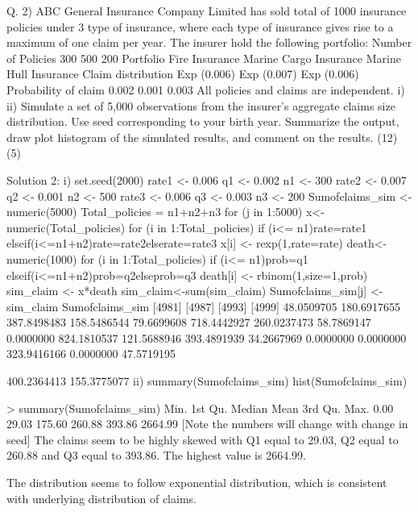 \documentclass[a4paper,12pt]{article}
\begin{document}
Q. 2) ABC General Insurance Company Limited has sold total of 1000 insurance policies under 3
type of insurance, where each type of insurance gives rise to a maximum of one claim per year.
The insurer hold the following portfolio:
Number of
Policies
300
500
200
Portfolio
Fire Insurance
Marine Cargo Insurance
Marine Hull Insurance
Claim
distribution
Exp (0.006)
Exp (0.007)
Exp (0.006)
Probability of
claim
0.002
0.001
0.003
All policies and claims are independent.
i)
ii)
Simulate a set of 5,000 observations from the insurer’s aggregate claims size
distribution. Use seed corresponding to your birth year.
Summarize the output, draw plot histogram of the simulated results, and comment on
the results.
(12)
(5)


Solution 2:
i) set.seed(2000)
rate1 <- 0.006
q1 <- 0.002
n1 <- 300
rate2 <- 0.007
q2 <- 0.001
n2 <- 500
rate3 <- 0.006
q3 <- 0.003
n3 <- 200
Sumofclaims_sim <- numeric(5000)
Total_policies = n1+n2+n3
for (j in 1:5000){
x<-numeric(Total_policies)
for (i in 1:Total_policies)
{if (i<= n1){rate=rate1} else{if(i<=n1+n2){rate=rate2}else{rate=rate3}}
x[i] <- rexp(1,rate=rate)}
death<-numeric(1000)
for (i in 1:Total_policies)
{if (i<= n1){prob=q1} else{if(i<=n1+n2){prob=q2}else{prob=q3}}
death[i] <- rbinom(1,size=1,prob)}
sim_claim <- x*death
sim_claim<-sum(sim_claim)
Sumofclaims_sim[j] <- sim_claim
}
Sumofclaims_sim
[4981]
[4987]
[4993]
[4999]
48.0509705 180.6917655 387.8498483 158.5486544 79.6699608 718.4442927
260.0237473 58.7869147 0.0000000 824.1810537 121.5688946 393.4891939
34.2667969 0.0000000 0.0000000 323.9416166 0.0000000 47.5719195




400.2364413 155.3775077
ii) summary(Sumofclaims_sim)
hist(Sumofclaims_sim)

> summary(Sumofclaims_sim)
Min. 1st Qu. Median
Mean 3rd Qu.
Max.
0.00
29.03 175.60 260.88 393.86 2664.99
[Note the numbers will change with change in seed]
The claims seem to be highly skewed with Q1 equal to 29.03, Q2 equal to 260.88 and Q3 equal to
393.86. The highest value is 2664.99.

The distribution seems to follow exponential distribution, which is consistent with underlying
distribution of claims.
\end{document}
